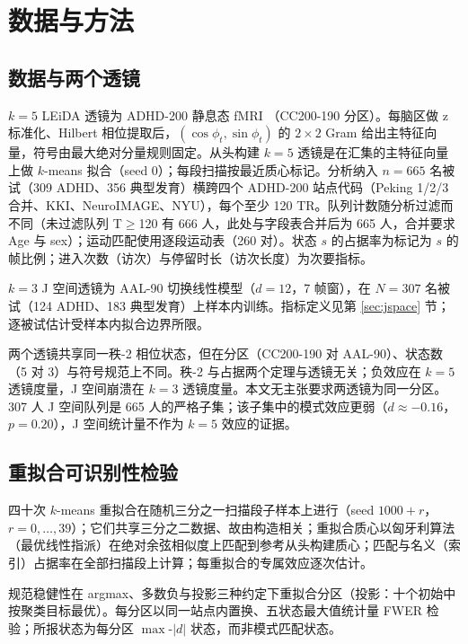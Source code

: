 \documentclass[11pt]{ctexart}
\theoremstyle{definition}
\begin{document}
\section{数据与方法}
\label{sec:methods}

\subsection{数据与两个透镜}
$k=5$ LEiDA 透镜为 ADHD-200 静息态 fMRI \cite{ADHD2002012}（CC200-190 分区）。每脑区做 z 标准化、Hilbert 相位提取后，$(\cos\phi_t,\sin\phi_t)$ 的 $2\times2$ Gram 给出主特征向量，符号由最大绝对分量规则固定。从头构建 $k=5$ 透镜是在汇集的主特征向量上做 $k$-means 拟合（seed 0）；每段扫描按最近质心标记。分析纳入 $n=665$ 名被试（309 ADHD、356 典型发育）横跨四个 ADHD-200 站点代码（Peking 1/2/3 合并、KKI、NeuroIMAGE、NYU），每个至少 120 TR。队列计数随分析过滤而不同（未过滤队列 T$\ge$120 有 666 人，此处与字段表合并后为 665 人，合并要求 Age 与 sex）；运动匹配使用逐段运动表（260 对）。状态 $s$ 的占据率为标记为 $s$ 的帧比例；进入次数（访次）与停留时长（访次长度）为次要指标。

$k=3$ J 空间透镜为 AAL-90 切换线性模型（$d=12$，7 帧窗），在 $N=307$ 名被试（124 ADHD、183 典型发育）上样本内训练。指标定义见第 \ref{sec:jspace} 节；逐被试估计受样本内拟合边界所限。

两个透镜共享同一秩-2 相位状态，但在分区（CC200-190 对 AAL-90）、状态数（5 对 3）与符号规范上不同。秩-2 与占据两个定理与透镜无关；负效应在 $k=5$ 透镜度量，J 空间崩溃在 $k=3$ 透镜度量。本文无主张要求两透镜为同一分区。307 人 J 空间队列是 665 人的严格子集；该子集中的模式效应更弱（$d\approx-0.16$，$p=0.20$），J 空间统计量不作为 $k=5$ 效应的证据。

\subsection{重拟合可识别性检验}
四十次 $k$-means 重拟合在随机三分之一扫描段子样本上进行（seed $1000+r$，$r=0,\dots,39$）；它们共享三分之二数据、故由构造相关；重拟合质心以匈牙利算法（最优线性指派）在绝对余弦相似度上匹配到参考从头构建质心；匹配与名义（索引）占据率在全部扫描段上计算；每重拟合的专属效应逐次估计。

规范稳健性在 argmax、多数负与投影三种约定下重拟合分区（投影：十个初始中按聚类目标最优）。每分区以同一站点内置换、五状态最大值统计量 FWER 检验；所报状态为每分区 $\max$-$|d|$ 状态，而非模式匹配状态。
\end{document}
